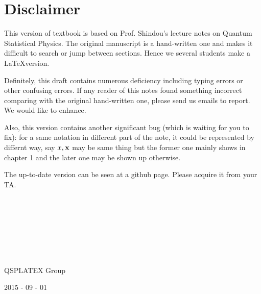 ﻿\chapter*{Disclaimer}

This version of textbook is based on Prof. Shindou's lecture notes on Quantum Statistical Physics. The original manuscript is a hand-written one and makes it difficult to search or jump between sections. Hence we several students make a \LaTeX version. 

Definitely, this draft contains numerous deficiency including typing errors or other confusing errors. If any reader of this notes found something incorrect comparing with the original hand-written one, please send us emails to report. We would like to enhance. 

Also, this version contains another significant bug (which is waiting for you to fix): for a same notation in different part of the note, it could be represented by differnt way, say $x, \bf{x}$ may be same thing but the former one mainly shows in chapter 1 and the later one may be shown up otherwise. 

The up-to-date version can be seen at a github page. Please acquire it from your TA. 

\ 

\ 

\ 

\ 

QSPLATEX Group

2015 - 09 - 01


